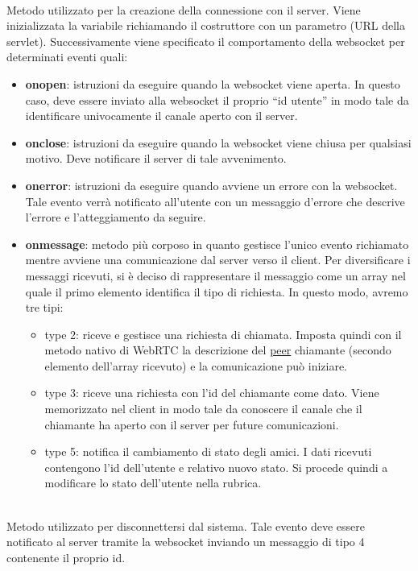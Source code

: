 \begin{description}
\item{}\\
Metodo utilizzato per la creazione della connessione con il server. Viene inizializzata la variabile  richiamando il costruttore con un parametro (URL della servlet). Successivamente viene specificato il comportamento della websocket per determinati eventi quali:
\begin{itemize}
\item \textbf{onopen}: istruzioni da eseguire quando la websocket viene aperta. In questo caso, deve essere inviato alla websocket il proprio ``id utente'' in modo tale da identificare univocamente il canale aperto con il server.
\item \textbf{onclose}: istruzioni da eseguire quando la websocket viene chiusa per qualsiasi motivo. Deve notificare il server di tale avvenimento.
\item \textbf{onerror}: istruzioni da eseguire quando avviene un errore con la websocket. Tale evento verrà notificato all'utente con un messaggio d'errore che descrive l'errore e l'atteggiamento da seguire.
\item \textbf{onmessage}: metodo più corposo in quanto gestisce l'unico evento richiamato mentre avviene una comunicazione dal server verso il client. Per diversificare i messaggi ricevuti, si è deciso di rappresentare il messaggio come un array nel quale il primo elemento identifica il tipo di richiesta. In questo modo, avremo tre tipi:
\begin{itemize}
\item type 2: riceve e gestisce una richiesta di chiamata. Imposta quindi con il metodo nativo di WebRTC  la descrizione del \underline{peer} chiamante (secondo elemento dell'array ricevuto) e la comunicazione può iniziare.
\item type 3: riceve una richiesta con l'id del chiamante come dato. Viene memorizzato nel client in modo tale da conoscere il canale che il chiamante ha aperto con il server per future comunicazioni.
\item type 5: notifica il cambiamento di stato degli amici. I dati ricevuti contengono l'id dell'utente e relativo nuovo stato. Si procede quindi a modificare lo stato dell'utente nella rubrica.
\end{itemize}
\end{itemize}
 
\item{}\\
Metodo utilizzato per disconnettersi dal sistema. Tale evento deve essere notificato al server tramite la websocket inviando un messaggio di tipo 4 contenente il proprio id.


\end{description}
